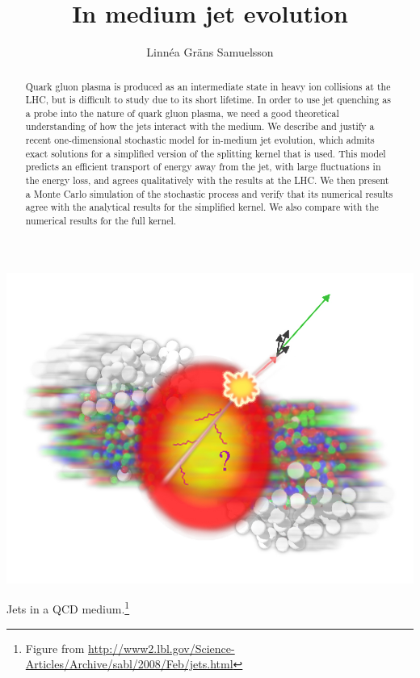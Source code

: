 \documentclass[a4paper,12pt]{article}
\numberwithin{equation}{section}
\begin{document}
\author{Linnéa Gräns Samuelsson}
\title{In medium jet evolution}

\begin{titlepage}
\maketitle 
\thispagestyle{fancy}
\renewcommand{\headrulewidth}{0pt}

\begin{abstract}
Quark gluon plasma is produced as an intermediate state in heavy ion collisions at the LHC, but is difficult to study due to its short lifetime. In order to use jet quenching as a probe into the nature of quark gluon plasma, we need a good theoretical understanding of how the jets interact with the medium. We describe and justify a recent one-dimensional stochastic model for in-medium jet evolution, which admits exact solutions for a simplified version of the splitting kernel that is used. This model predicts an efficient transport of energy away from the jet, with large fluctuations in the energy loss, and agrees qualitatively with the results at the LHC. We then present a Monte Carlo simulation of the stochastic process and verify that its numerical results agree with the analytical results for the simplified kernel. We also compare with the numerical results for the full kernel.
\end{abstract}



\begin{center}
\includegraphics[width=0.5\linewidth]{jet-quenching.jpg}


\small{Jets in a QCD medium.\footnote{Figure from \url{http://www2.lbl.gov/Science-Articles/Archive/sabl/2008/Feb/jets.html}}}
\end{center}



\end{titlepage}
\end{document}
